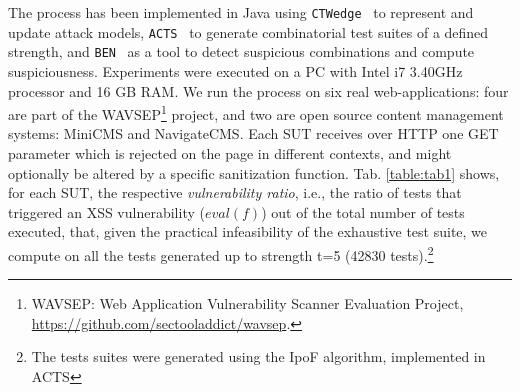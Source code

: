 \begin{tikzborder}{\cite{Gargantini16:validation}}
\begin{tikzborder}{\cite{gargantini_combinatorial_2017}}
\begin{tikzborder}{\cite{gargantini_combinatorial_2017}}
\begin{tikzborder}{\cite{garn2019}}
\bb The process has been implemented in Java using {\tt CTWedge}~\cite{IWCTGargantini2018} to represent and update attack models, {\tt ACTS}~\cite{ACTS} to generate combinatorial test suites of a defined strength, and {\tt BEN}~\cite{ghandehari2018combinatorial} as a tool to detect suspicious combinations and compute suspiciousness.
Experiments were executed on a PC with Intel i7 3.40GHz processor and 16 GB RAM.
We run the process on six real web-applications: four are part of the WAVSEP\footnote{WAVSEP: Web Application Vulnerability Scanner Evaluation Project, \url{https://github.com/sectooladdict/wavsep}.} project, and two are open source content management systems: MiniCMS and NavigateCMS.
Each SUT receives over HTTP one GET parameter which is rejected on the page in different contexts, and might optionally be altered by a specific sanitization function.
Tab. \ref{table:tab1} shows, for each SUT, the respective \textit{vulnerability ratio}, i.e., the ratio of tests that triggered an XSS vulnerability ($\mathit{eval}(f)$) out of the total number of tests executed, that, given the practical infeasibility of the exhaustive test suite, we compute on all the tests generated up to strength t=5 %
(42830 tests).\footnote{The tests suites were generated using the IpoF algorithm, implemented in ACTS}\be
\begin{table}[ht]
\centering
\caption{XSS reflection sites on WAVSEP benchmarks}\label{table:tab1}
\end{table}


\end{tikzborder}
\end{tikzborder}
\end{tikzborder}
\end{tikzborder}
